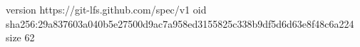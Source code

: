 version https://git-lfs.github.com/spec/v1
oid sha256:29a837603a040b5e27500d9ac7a958ed3155825c338b9df5d6d63e8f48c6a224
size 62
